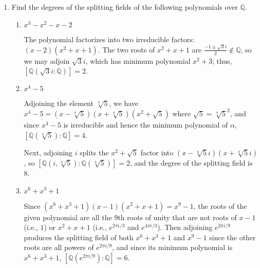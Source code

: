 \documentclass[12pt]{article}
\newcommand{\QQ}{\mathbb{Q}}
\begin{document}
\begin{enumerate}
    \item Find the degrees of the splitting fields of the following polynomials over $\QQ$.
    \begin{enumerate}
        \item $x^3-x^2-x-2$ \par
            The polynomial factorizes into two irreducible factors: $(x - 2)(x^2 + x + 1)$. The two roots of $x^2 + x + 1$ are $\frac{-1 \pm \sqrt{3}i}{2} \notin \mathbb{Q}$, so we may adjoin $\sqrt{3}i$, which has minimum polynomial $x^2 + 3$; thus, $\left[ \mathbb{Q}(\sqrt{3}i : \mathbb{Q}) \right] = 2$.
        \item $x^4-5$ \par
            Adjoining the element $\sqrt[4]{5}$, we have $x^4 - 5 = (x - \sqrt[4]{5})(x + \sqrt[4]{5})(x^2 + \sqrt{5})$ where $\sqrt{5} = \sqrt[4]{5}^2$, and since $x^4 - 5$ is irreducible and hence the minimum polynomial of $\alpha$, $[\QQ(\sqrt[4]{5}) : \QQ] = 4$. \par
            Next, adjoining $i$ splits the $x^2 + \sqrt{5}$ factor into $(x - \sqrt[4]{5}i)(x + \sqrt[4]{5}i)$, so $[\mathbb{Q}(i, \sqrt[4]{5}) : \mathbb{Q}(\sqrt[4]{5})] = 2$, and the degree of the splitting field is $8$.
        \item $x^6+x^3+1$ \par
            Since $(x^6 + x^3 + 1)(x - 1)(x^2 + x + 1) = x^9 - 1$, the roots of the given polynomial are all the $9$th roots of unity that are not roots of $x - 1$ (i.e., $1$) or $x^2 + x + 1$ (i.e., $e^{2\pi i/3}$ and $e^{4\pi i/3}$). Then adjoining $e^{2\pi i/9}$ produces the splitting field of both $x^6 + x^3 + 1$ and $x^9 - 1$ since the other roots are all powers of $e^{2\pi i/9}$, and since its minimum polynomial is $x^6 + x^3 + 1$, $[\mathbb{Q}(e^{2\pi i/9}) : \mathbb{Q}] = 6$.
    \end{enumerate}


\end{enumerate}
\end{document}

